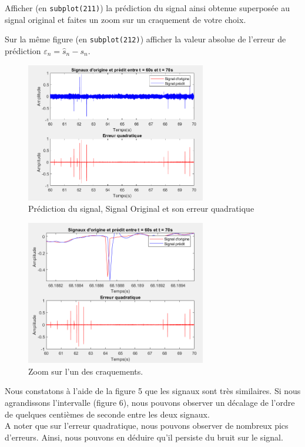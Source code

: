 \documentclass{article}
\begin{document}
Afficher (en {\tt subplot(211)}) la prédiction du signal ainsi obtenue superposée au  signal original et faites un zoom sur un craquement de votre choix.

Sur la même figure (en {\tt subplot(212)}) afficher la valeur absolue de l'erreur de prédiction $\varepsilon_n = \hat{s}_n - s_n$.

\begin{figure}[!h]
    \centering
    \includegraphics[width=0.7\textwidth]{images/global.png}
    \caption{Prédiction du signal, Signal Original et son erreur quadratique }
    \label{fig-binaire}
\end{figure}
\clearpage

\begin{figure}[!h]
    \centering
    \includegraphics[width=0.7\textwidth]{images/zoom.png}
    \caption{Zoom sur l'un des craquements.}
    \label{fig-binaire}
\end{figure}

Nous constatons à l'aide de la figure 5 que les signaux sont très similaires. Si nous agrandissons l'intervalle (figure 6),  nous pouvons observer un décalage de l'ordre de quelques centièmes de seconde entre les deux signaux.\\ 
A noter que sur l'erreur quadratique, nous pouvons observer  de nombreux pics d'erreurs. Ainsi, nous pouvons en déduire qu'il persiste du bruit sur le signal.\\
\clearpage
\end{document}
